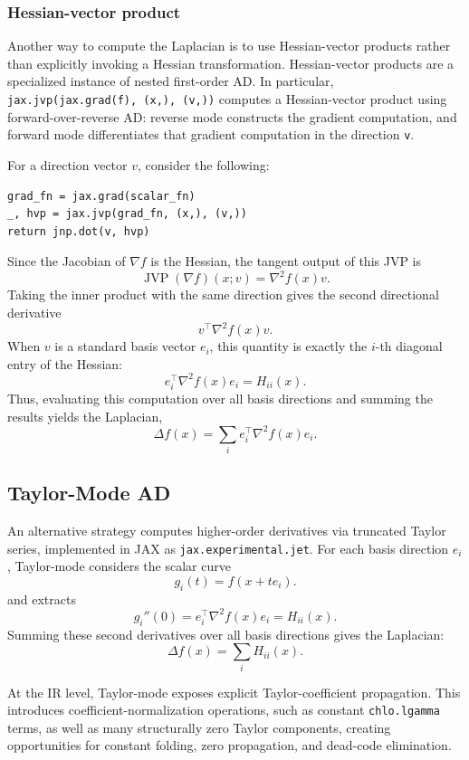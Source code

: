 \documentclass{article}
\theoremstyle{plain}
\theoremstyle{definition}
\theoremstyle{remark}
\begin{document}
\subsubsection{Hessian-vector product}
Another way to compute the Laplacian is to use Hessian-vector products
rather than explicitly invoking a Hessian transformation. Hessian-vector products are a specialized instance of nested first-order AD. In particular, \texttt{jax.jvp(jax.grad(f), (x,), (v,))} computes a Hessian-vector product using forward-over-reverse AD: reverse mode constructs the gradient computation, and forward mode differentiates that gradient computation in the direction \texttt{v}.

For a direction vector $v$, consider the following:
\begin{verbatim}
grad_fn = jax.grad(scalar_fn)
_, hvp = jax.jvp(grad_fn, (x,), (v,))
return jnp.dot(v, hvp)
\end{verbatim}

Since the Jacobian of $\nabla f$ is the Hessian, the tangent output of this
JVP is
\[
  \operatorname{JVP}(\nabla f)(x; v)
  =
  \nabla^2 f(x)v.
\]
Taking the inner product with the same direction gives the second directional
derivative
\[
  v^\top \nabla^2 f(x)v.
\]
When $v$ is a standard basis vector $e_i$, this quantity is exactly the
$i$-th diagonal entry of the Hessian:
\[
  e_i^\top \nabla^2 f(x)e_i = H_{ii}(x).
\]
Thus, evaluating this computation over all basis directions and summing the
results yields the Laplacian,
\[
  \Delta f(x)
  =
  \sum_i e_i^\top \nabla^2 f(x)e_i.
\]

\subsection{Taylor-Mode AD}
An alternative strategy computes higher-order derivatives via truncated Taylor series, implemented in JAX as \texttt{jax.experimental.jet}. For each basis direction $e_i$, Taylor-mode considers the scalar curve 
\[
  g_i(t) = f(x + t e_i).
\]
and extracts
\[
  g_i''(0)
  =
  e_i^\top \nabla^2 f(x)e_i
  =
  H_{ii}(x).
\]
Summing these second derivatives over all basis directions gives the Laplacian:
\[
  \Delta f(x) = \sum_i H_{ii}(x).
\]

At the IR level, Taylor-mode exposes explicit Taylor-coefficient propagation. This introduces
coefficient-normalization operations, such as constant \texttt{chlo.lgamma}
terms, as well as many structurally zero Taylor components, creating
opportunities for constant folding, zero propagation,
and dead-code elimination.
\end{document}
